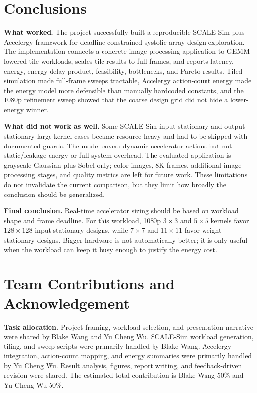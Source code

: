\documentclass[12pt]{article}
\begin{document}
\section{Conclusions}

\textbf{What worked.} The project successfully built a reproducible SCALE-Sim plus Accelergy framework for deadline-constrained systolic-array design exploration. The implementation connects a concrete image-processing application to GEMM-lowered tile workloads, scales tile results to full frames, and reports latency, energy, energy-delay product, feasibility, bottlenecks, and Pareto results. Tiled simulation made full-frame sweeps tractable, Accelergy action-count energy made the energy model more defensible than manually hardcoded constants, and the 1080p refinement sweep showed that the coarse design grid did not hide a lower-energy winner.

\textbf{What did not work as well.} Some SCALE-Sim input-stationary and output-stationary large-kernel cases became resource-heavy and had to be skipped with documented guards. The model covers dynamic accelerator actions but not static/leakage energy or full-system overhead. The evaluated application is grayscale Gaussian plus Sobel only; color images, 8K frames, additional image-processing stages, and quality metrics are left for future work. These limitations do not invalidate the current comparison, but they limit how broadly the conclusion should be generalized.

\textbf{Final conclusion.} Real-time accelerator sizing should be based on workload shape and frame deadline. For this workload, 1080p $3\times3$ and $5\times5$ kernels favor $128\times128$ input-stationary designs, while $7\times7$ and $11\times11$ favor weight-stationary designs. Bigger hardware is not automatically better; it is only useful when the workload can keep it busy enough to justify the energy cost.

\section{Team Contributions and Acknowledgement}

\textbf{Task allocation.} Project framing, workload selection, and presentation narrative were shared by Blake Wang and Yu Cheng Wu. SCALE-Sim workload generation, tiling, and sweep scripts were primarily handled by Blake Wang. Accelergy integration, action-count mapping, and energy summaries were primarily handled by Yu Cheng Wu. Result analysis, figures, report writing, and feedback-driven revision were shared. The estimated total contribution is Blake Wang 50\% and Yu Cheng Wu 50\%.
\end{document}
